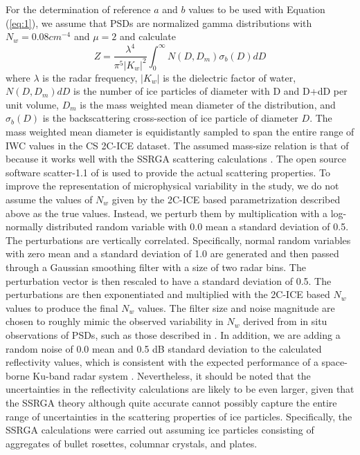 \documentclass{ametsocV6.1}
\begin{document}
For the determination of reference $a$ and $b$ values to be used with Equation (\ref{eq:1}), we assume that 
PSDs are normalized gamma  distributions with $N_w=0.08cm^{-4}$ and $\mu=2$ and calculate 
\begin{equation}
 Z=\frac {\lambda ^4} {\pi ^5 |K_w|^2} \int_0^{\infty} N(D,D_m) \sigma _b(D) dD
\end{equation}
where $\lambda$ is the radar frequency, $|K_w|$ is the dielectric factor of water, $N(D,D_m) dD$ is the number 
of ice particles of diameter with D and D+dD per unit volume, $D_m$ is the mass weighted mean diameter of the 
distribution, and $\sigma _b(D)$ is the backscattering cross-section of ice particle of diameter $D$. The mass 
weighted mean diameter is equidistantly sampled to span the entire range of IWC values in the CS 2C-ICE dataset.
The assumed mass-size relation is that of \cite{brown1995improved} because it works well with the 
SSRGA scattering calculations \citep{heymsfield2022impacts}.  The open source software scatter-1.1 of \citep{scatter-1.1}
is used to provide the actual scattering properties.   
To improve the representation of microphysical variability in the study, we do not assume the values of $N_w$ given
by the 2C-ICE based parametrization described above as the true values. Instead, we perturb them by multiplication 
with a log-normally distributed random variable with 0.0 mean a standard deviation of 0.5.  The 
perturbations are vertically correlated. Specifically, normal random variables with zero mean and a standard deviation
of 1.0 are generated and then passed through a Gaussian smoothing filter \citep{nixon2019} with a size of two radar bins. The perturbation
vector is then rescaled to have a standard deviation of 0.5.  The perturbations are then exponentiated and multiplied
with the 2C-ICE based $N_w$ values to produce the final $N_w$ values.  The filter size and noise magnitude are chosen
to roughly mimic the observed variability in $N_w$ derived from in situ observations of PSDs, such as those described
in \cite{heymsfield2022impacts}. In addition, we are adding a random noise of
0.0 mean and 0.5 dB standard deviation to the calculated reflectivity values, which is consistent with the expected
performance of a space-borne Ku-band radar system \citep{takahashi2008}.  Nevertheless, it should be noted that the
uncertainties in the reflectivity calculations are likely to be even larger, given that the SSRGA theory although 
quite accurate cannot possibly capture the entire range of uncertainties in the scattering properties of ice particles.
Specifically, the SSRGA calculations were carried out assuming ice particles consisting of aggregates of 
bullet rosettes, columnar crystals, and plates.
\end{document}
